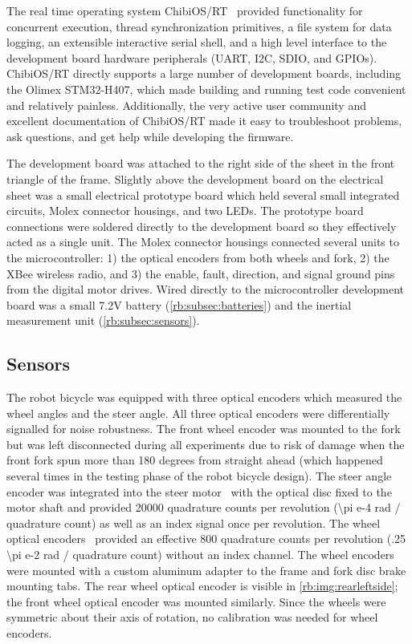 The real time operating system ChibiOS/RT~\cite{ChibiOS} provided functionality
for concurrent execution, thread synchronization primitives, a file system for
data logging, an extensible interactive serial shell, and a high level
interface to the development board hardware peripherals (UART, I2C, SDIO, and
GPIOs). ChibiOS/RT directly supports a large number of development boards,
including the Olimex STM32-H407, which made building and running test code
convenient and relatively painless.  Additionally, the very active user
community and excellent documentation of ChibiOS/RT made it easy to
troubleshoot problems, ask questions, and get help while developing the
firmware.

The development board was attached to the right side of the sheet in the front
triangle of the frame. Slightly above the development board on the electrical
sheet was a small electrical prototype board which held several small
integrated circuits, Molex connector housings, and two LEDs. The prototype
board connections were soldered directly to the development board so they
effectively acted as a single unit. The Molex connector housings connected
several units to the microcontroller: 1) the optical encoders from both wheels
and fork, 2) the XBee wireless radio, and 3) the enable, fault, direction, and
signal ground pins from the digital motor drives. Wired directly to the
microcontroller development board was a small 7.2V battery
(\autoref{rb:subsec:batteries}) and the inertial measurement unit
(\autoref{rb:subsec:sensors}).

\subsection{Sensors} \label{rb:subsec:sensors}
The robot bicycle was equipped with three optical encoders which measured the
wheel angles and the steer angle. All three optical encoders were
differentially signalled for noise robustness. The front wheel encoder was mounted
to the fork but was left disconnected during all experiments due to risk of
damage when the front fork spun more than 180 degrees from straight ahead
(which happened several times in the testing phase of the robot bicycle
design). The steer angle encoder was integrated into the steer
motor~\cite{TeknicM3441} with the optical disc fixed to the motor shaft and
provided 20000 quadrature counts per revolution (\num{\pi e-4} rad / quadrature
count) as well as an index signal once per revolution. The wheel optical
encoders~\cite{USDigitalH5} provided an effective 800 quadrature counts per
revolution (\num{.25 \pi e-2} rad / quadrature count) without an index channel. The
wheel encoders were mounted with a custom aluminum adapter to the frame and
fork disc brake mounting tabs. The rear wheel optical encoder is visible in
\autoref{rb:img:rearleftside}; the front wheel optical encoder was mounted
similarly. Since the wheels were symmetric about their axis of rotation, no
calibration was needed for wheel encoders.

